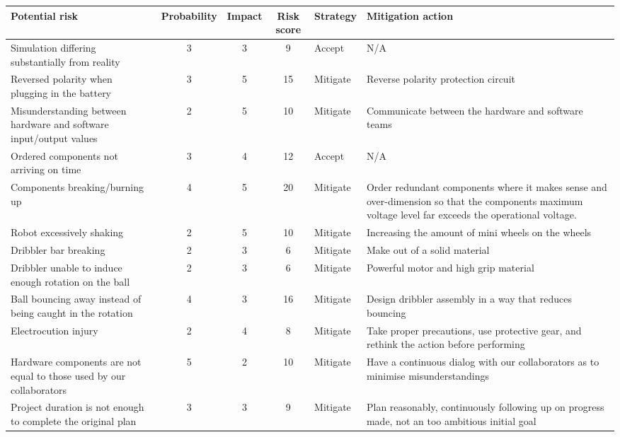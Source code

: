 \begin{table}[H]
    \centering
    \begin{tabularx}{\textwidth}{|X|c|c|c|X|X|} \hline
         \textbf{Potential risk}                            & \textbf{Probability}  & \textbf{Impact}   & \textbf{Risk score}   & \textbf{Strategy}     & \textbf{Mitigation action} \\ \hline
         Simulation differing substantially from reality    & 3                     & 3                 & 9                     & Accept                & N/A \\ \hline
         Reversed polarity when plugging in the battery & 3 & 5 & 15 & Mitigate & Reverse polarity protection circuit \\ \hline
         Misunderstanding between hardware and software input/output values & 2 & 5 & 10 & Mitigate & Communicate between the hardware and software teams \\ \hline
         Ordered components not arriving on time & 3 & 4 & 12 & Accept & N/A \\ \hline
         Components breaking/burning up & 4 & 5 & 20 & Mitigate & Order redundant components where it makes sense and over-dimension so that the components maximum voltage level far exceeds the operational voltage.\\ \hline
         Robot excessively shaking & 2 & 5 & 10 & Mitigate & Increasing the amount of mini wheels on the wheels \\ \hline
         Dribbler bar breaking & 2 & 3 & 6 & Mitigate & Make out of a solid material \\ \hline
         Dribbler unable to induce enough rotation on the ball & 2 & 3 & 6 & Mitigate & Powerful motor and high grip material \\ \hline
         Ball bouncing away instead of being caught in the rotation & 4 & 3 & 16 & Mitigate & Design dribbler assembly in a way that reduces bouncing \\ \hline
         Electrocution injury & 2 & 4 & 8 & Mitigate & Take proper precautions, use protective gear, and rethink the action before performing \\ \hline
         Hardware components are not equal to those used by our collaborators & 5 & 2 & 10 & Mitigate & Have a continuous dialog with our collaborators as to minimise misunderstandings \\ \hline
         Project duration is not enough to complete the original plan & 3 & 3 & 9 & Mitigate & Plan reasonably, continuously following up on progress made, not an too ambitious initial goal \\ \hline

\end{tabularx}
\end{table}

